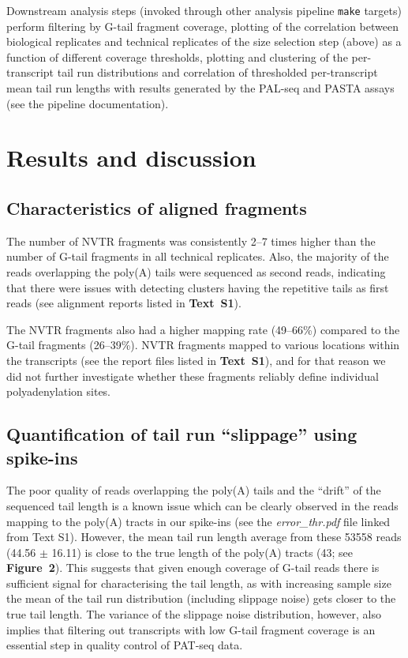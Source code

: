 \documentclass[10pt]{article}
\begin{document}
Downstream analysis steps (invoked through other analysis pipeline \texttt{make} targets) perform filtering by G-tail fragment coverage, plotting of the correlation between biological replicates and technical replicates of the size selection step (above) as a function of different coverage thresholds, plotting and clustering of the per-transcript tail run distributions and correlation of thresholded per-transcript mean tail run lengths with results generated by the PAL-seq \cite{subtelny14} and PASTA \cite{beilharz07} assays (see the pipeline documentation).

\section*{Results and discussion}

\subsection*{Characteristics of aligned fragments}

The number of NVTR fragments was consistently 2--7 times higher than the number of G-tail fragments in all technical replicates. Also, the majority of the reads overlapping the poly(A) tails were sequenced as second reads, indicating that there were issues with detecting clusters having the repetitive tails as first reads (see alignment reports listed in \textbf{Text~S1}).

The NVTR fragments also had a higher mapping rate (49--66\%) compared to the G-tail fragments (26--39\%).  NVTR fragments mapped to various locations within the transcripts (see the report files listed in \textbf{Text~S1}), and for that reason we did not further investigate whether these fragments reliably define individual polyadenylation sites.

\subsection*{Quantification of tail run ``slippage'' using spike-ins}

The poor quality of reads overlapping the poly(A) tails and the ``drift'' of the sequenced tail length is a known issue \cite{wilkening13} which can be clearly observed in the reads mapping to the poly(A) tracts in our spike-ins (see the \textit{error\_thr.pdf} file linked from Text S1). However, the mean tail run length average from these 53558 reads (44.56 $\pm$ 16.11) is close to the true length of the poly(A) tracts (43; see \textbf{Figure~2}). This suggests that given enough coverage of G-tail reads there is sufficient signal for characterising the tail length, as with increasing sample size the mean of the tail run distribution (including slippage noise) gets closer to the true tail length. The variance of the slippage noise distribution, however, also implies that filtering out transcripts with low G-tail fragment coverage is an essential step in quality control of PAT-seq data.
\end{document}
